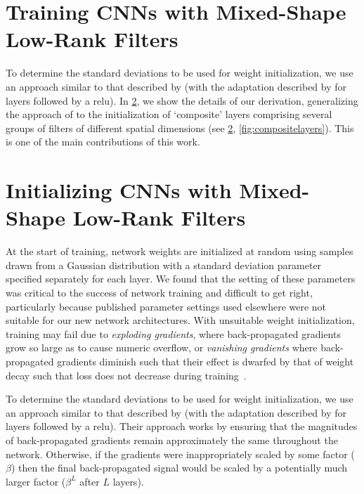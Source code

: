 \documentclass[thesis]{subfiles}
\begin{document}
    \section{Training CNNs with Mixed-Shape Low-Rank Filters}\label{initialization}
    To determine the standard deviations to be used for weight initialization, we use an approach similar to that described by \citet{glorot2010understanding} (with the adaptation described by \citet{He2015b} for layers followed by a \gls{relu}). In \cref{initializationderivation}, we show the details of our derivation, generalizing the approach of \citet{He2015b} to the initialization of `composite' layers comprising several groups of filters of different spatial dimensions (see \cref{initializationderivation}, \cref{fig:compositelayers}). This is one of the main contributions of this work.
    
    \section{Initializing CNNs with Mixed-Shape Low-Rank Filters}\label{initializationderivation}
    At the start of training, network weights are initialized at random using samples drawn from a Gaussian distribution with a standard deviation parameter specified separately for each layer. We found that the setting of these parameters was critical to the success of network training and difficult to get right, particularly because published parameter settings used elsewhere were not suitable for our new network architectures. With unsuitable weight initialization, training may fail due to {\em exploding gradients}, where  back-propagated gradients grow so large as to cause numeric overflow, or {\em vanishing gradients} where back-propagated gradients diminish such that their effect is dwarfed by that of weight decay such that loss does not decrease during training~\citep{Hochreiter01gradientflow}.
    
    To determine the standard deviations to be used for weight initialization, we use an approach similar to that described by \citet{glorot2010understanding} (with the adaptation described by \citet{He2015b} for layers followed by a \gls{relu}). Their approach works by ensuring that the magnitudes of back-propagated gradients remain approximately the same throughout the network. Otherwise, if the gradients were inappropriately scaled by some factor (\eg $\beta$) then the final back-propagated signal would be scaled by a potentially much larger factor ($\beta^L$ after $L$ layers).
    
\end{document}
